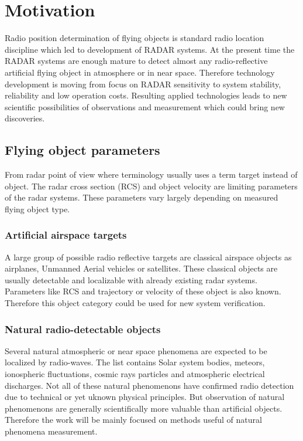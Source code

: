 \documentclass[twoside]{ctuthesis}
\theoremstyle{plain}
\theoremstyle{definition}
\theoremstyle{note}
\begin{document}
\maketitle

\chapter{Motivation}

Radio position determination of flying objects is standard radio location discipline which led to development of RADAR systems. At the present time the RADAR systems are enough mature to detect almost any radio-reflective artificial flying object in atmosphere or in near space. Therefore technology development is moving from focus on RADAR sensitivity to system stability, reliability and low operation costs. Resulting applied technologies leads to new scientific possibilities of observations and measurement which could bring new discoveries. 

\section{Flying object parameters}

From radar point of view where terminology usually uses a term target instead of object. The radar cross section (RCS) and object velocity are limiting parameters of the radar systems. These parameters vary largely depending on measured flying object type. 

\subsection{Artificial airspace targets}

A large group of possible radio reflective targets are classical airspace objects as airplanes, Unmanned Aerial vehicles or satellites. These classical objects are usually detectable and localizable with already existing radar systems. Parameters like RCS and trajectory or velocity of these object is also known. Therefore this object category could be used for new system verification. 

\subsection{Natural radio-detectable objects}

Several natural atmospheric or near space phenomena are expected to be localized by radio-waves. The list contains Solar system bodies, meteors, ionospheric fluctuations, cosmic rays particles and atmospheric electrical discharges. Not all of these natural phenomenons have confirmed radio detection due to technical or yet uknown physical principles. But observation of natural phenomenons are generally scientifically more valuable than artificial objects. Therefore the work will be mainly focused on methods useful of natural phenomena measurement. 
\end{document}
